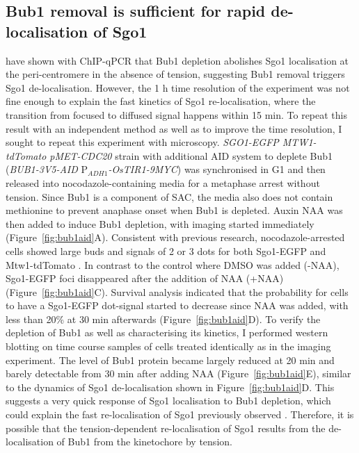 \subsection{Bub1 removal is sufficient for rapid de-localisation of Sgo1}
\cite{Nerusheva2014} have shown with ChIP-qPCR that Bub1 depletion abolishes Sgo1 localisation at the peri-centromere in the absence of tension, suggesting Bub1 removal triggers Sgo1 de-localisation. However, the 1 \si{\hour} time resolution of the experiment was not fine enough to explain the fast kinetics of Sgo1 re-localisation, where the transition from focused to diffused signal happens within 15 \si{\minute}. To repeat this result with an independent method as well as to improve the time resolution, I sought to repeat this experiment with microscopy. \textit{SGO1-EGFP MTW1-tdTomato pMET-CDC20} strain with additional AID system to deplete Bub1 (\textit{BUB1-3V5-AID} P$_{ADH1}$\textit{-OsTIR1-9MYC}) was synchronised in G1 and then released into nocodazole-containing media for a metaphase arrest without tension. Since Bub1 is a component of SAC, the media also does not contain methionine to prevent anaphase onset when Bub1 is depleted. Auxin NAA was then added to induce Bub1 depletion, with imaging started immediately (Figure~\ref{fig:bub1aid}A). Consistent with previous research, nocodazole-arrested cells showed large buds and signals of 2 or 3 dots for both Sgo1-EGFP and Mtw1-tdTomato \citep{Richmond2013Slk19Attachment}. In contrast to the control where DMSO was added (-NAA), Sgo1-EGFP foci disappeared after the addition of NAA (+NAA) (Figure~\ref{fig:bub1aid}C). Survival analysis indicated that the probability for cells to have a Sgo1-EGFP dot-signal started to decrease since NAA was added, with less than 20\% at 30 \si{\minute} afterwards (Figure~\ref{fig:bub1aid}D). To verify the depletion of Bub1 as well as characterising its kinetics, I performed western blotting on time course samples of cells treated identically as in the imaging experiment. The level of Bub1 protein became largely reduced at 20 \si{\minute} and barely detectable from 30 \si{\minute} after adding NAA (Figure~\ref{fig:bub1aid}E), similar to the dynamics of Sgo1 de-localisation shown in Figure~\ref{fig:bub1aid}D. This suggests a very quick response of Sgo1 localisation to Bub1 depletion, which could explain the fast re-localisation of Sgo1 previously observed \citep{Nerusheva2014}. Therefore, it is possible that the tension-dependent re-localisation of Sgo1 results from the de-localisation of Bub1 from the kinetochore by tension. 

